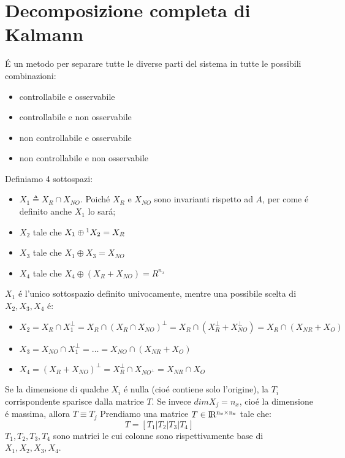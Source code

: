 \documentclass[../main.tex]{subfiles}
\begin{document}
	\section{Decomposizione completa di Kalmann}
		\'E un metodo per separare tutte le diverse parti del sistema in tutte le possibili combinazioni:
		\begin{itemize}
			\item controllabile e osservabile
			\item controllabile e non osservabile
			\item non controllabile e osservabile
			\item non controllabile e non osservabile
		\end{itemize}
		\medskip
		Definiamo 4 sottospazi:
		\begin{itemize}
			\item $ X_1 \triangleq X_R \cap X_{NO} $. Poich\'e $ X_R $ e $ X_{NO} $ sono invarianti rispetto ad $ A $, per come \'e definito anche $ X_1 $ lo sar\'a;
			\item $ X_2 $ tale che $ X_1 \oplus\footnotemark X_2 = X_R $
			\item $ X_3 $ tale che $ X_1 \oplus X_3 = X_{NO} $
			\item $ X_4 $ tale che $ X_4 \oplus (X_R + X_{NO}) = R^{n_x} $
		\end{itemize}
		\medskip
		$ X_1 $ \'e l'unico sottospazio definito univocamente, mentre una possibile scelta di $ X_2, X_3, X_4 $ \'e:
		\begin{itemize}
			\item $ X_2 = X_R \cap X_1^{\perp} = X_R \cap (X_R \cap X_{NO})^{\perp} = X_R \cap (X_R^{\perp} + X_{NO}^{\perp}) = X_R \cap (X_{NR} + X_O) $
			\item $ X_3 = X_{NO} \cap X_1^{\perp} = \dots = X_{NO} \cap (X_{NR} + X_O) $
			\item $ X_4 = (X_R + X_{NO})^{\perp} = X_R^{\perp} \cap X_{NO^{\perp}} = X_{NR} \cap X_O $
		\end{itemize}
		Se la dimensione di qualche $ X_i $ \'e nulla (cio\'e contiene solo l'origine), la $ T_i $ corrispondente sparisce dalla matrice $ T $. Se invece $ dim X_j = n_x $, cio\'e la dimensione \'e massima, allora $ T \equiv T_j $
		\medskip
		Prendiamo una matrice $ T \in \rm I\!R^{n_x \times n_x} $ tale che:
		\[
			T = \left[ T_1 | T_2 | T_3 | T_4 \right]
		\]
		$ T_1, T_2, T_3, T_4 $ sono matrici le cui colonne sono rispettivamente base di $ X_1, X_2, X_3, X_4 $.
		
\end{document}
